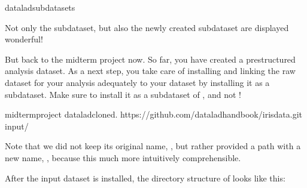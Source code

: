 \begin{sphinxVerbatim}[commandchars=\\\{\}]
dataladsubdatasets
\end{sphinxVerbatim}

\sphinxAtStartPar
Not only the  subdataset, but also the newly created
 subdataset are displayed \textendash{} wonderful!

\sphinxAtStartPar
But back to the midterm project now. So far, you have created a pre\sphinxhyphen{}structured
analysis dataset. As a next step, you take care of installing and linking the
raw dataset for your analysis adequately to your  dataset
by installing it as a subdataset. Make sure to install it as a subdataset of
, and not !

\begin{sphinxVerbatim}[commandchars=\\\{\}]
midterm\PYGZus{}project
dataladclone\PYGZhy{}d.
https://github.com/datalad\PYGZhy{}handbook/iris\PYGZus{}data.git
input/
\end{sphinxVerbatim}

\sphinxAtStartPar
Note that we did not keep its original name, , but rather provided
a path with a new name, , because this much more intuitively comprehensible.

\sphinxAtStartPar
After the input dataset is installed, the directory structure of 
looks like this:


